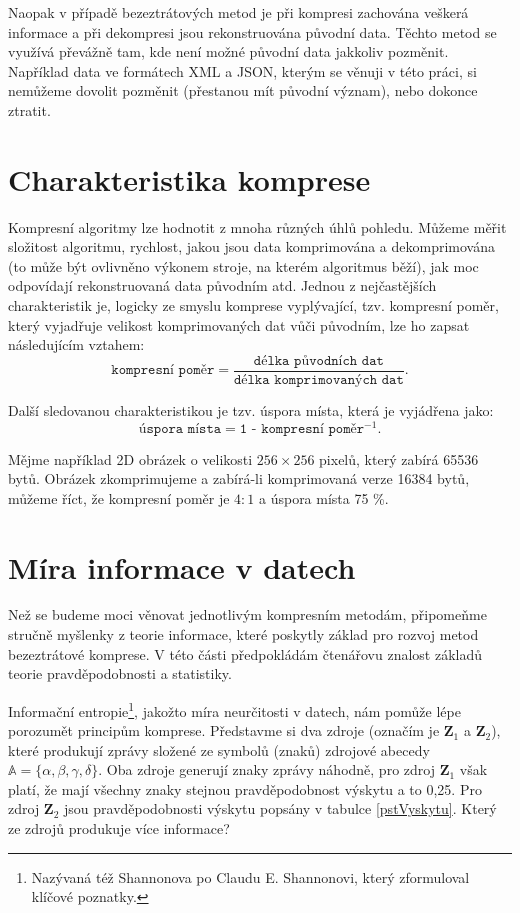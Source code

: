 Naopak v případě bezeztrátových metod je při kompresi zachována veškerá informace a při dekompresi
jsou rekonstruována původní data. Těchto metod se využívá převážně tam, kde není možné původní data jakkoliv pozměnit. Například data ve formátech XML a JSON, kterým se věnuji v této práci, si nemůžeme dovolit pozměnit (přestanou mít původní význam), nebo dokonce ztratit.

\section{Charakteristika komprese}
Kompresní algoritmy lze hodnotit z mnoha různých úhlů pohledu. Můžeme měřit složitost algoritmu, rychlost, jakou jsou data komprimována a dekomprimována (to může být ovlivněno výkonem stroje, na kterém algoritmus běží), jak moc odpovídají rekonstruovaná data původním atd.
Jednou z nejčastějších charakteristik je, logicky ze smyslu komprese vy\-plý\-va\-jí\-cí, tzv. kompresní poměr, který vyjadřuje velikost komprimovaných dat vůči původním, lze ho zapsat následujícím  vztahem:
\begin{equation}
\texttt{kompresní poměr} = \frac{\texttt{délka původních dat}}{\texttt{délka komprimovaných dat}}.
\end{equation}

Další sledovanou charakteristikou je tzv. úspora místa, která je vyjádřena jako:
\begin{equation}
\texttt{úspora místa} = \texttt{1 - kompresní poměr$^{-1}$}.
\end{equation}

Mějme například 2D obrázek o velikosti $256\times256$ pixelů, který zabírá 65536 bytů. Obrázek zkomprimujeme a zabírá-li komprimovaná verze 16384 bytů, můžeme říct, že kompresní poměr je $4:1$ a úspora místa 75 \%. 

\section{Míra informace v datech}
Než se budeme moci věnovat jednotlivým kompresním metodám, připomeňme stručně myšlenky z teorie informace, které poskytly základ pro rozvoj metod bezeztrátové komprese. V této části předpokládám čtenářovu znalost základů teorie pravděpodobnosti a statistiky.

Informační entropie\footnote{Nazývaná též Shannonova po Claudu E. Shannonovi, který zformuloval klíčové poznatky.}, jakožto míra neurčitosti v datech, nám pomůže lépe porozumět principům komprese. Představme si dva zdroje (označím je $\mathbf{Z}_1$ a $\mathbf{Z}_2$), které produkují zprávy složené ze symbolů (znaků) zdrojové abecedy $\mathbb{A} = \{\alpha, \beta, \gamma, \delta\}$. Oba zdroje generují znaky zprávy náhodně, pro zdroj $\mathbf{Z}_1$ však platí, že mají všechny znaky stejnou pravděpodobnost výskytu a to 0,25. Pro zdroj $\mathbf{Z}_2$ jsou pravděpodobnosti výskytu popsány v tabulce \ref{pstVyskytu}. Který ze zdrojů produkuje více informace?

